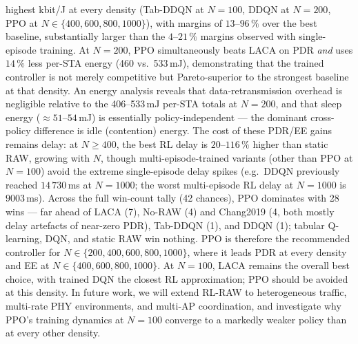 \documentclass[conference]{IEEEtran}
\begin{document}
highest kbit/J at every density (Tab-DDQN at $N=100$, DDQN at $N=200$, PPO
at $N\in\{400,600,800,1000\}$), with margins of $13$--$96\,\%$ over
the best baseline, substantially larger than the
$4$--$21\,\%$ margins observed with single-episode training.
At $N=200$, PPO simultaneously beats LACA on PDR \emph{and} uses $14\,\%$
less per-STA energy (460 vs.\ 533\,mJ), demonstrating that the trained
controller is not merely competitive but Pareto-superior to the strongest
baseline at that density.
An energy analysis reveals that data-retransmission overhead is negligible
relative to the 406--533\,mJ per-STA totals at $N=200$, and that sleep
energy ($\approx51$--$54$\,mJ) is essentially policy-independent — the
dominant cross-policy difference is idle (contention) energy.
The cost of these PDR/EE gains remains delay: at $N\geq400$, the best RL
delay is $20$--$116\,\%$ higher than static RAW, growing with $N$, though
multi-episode-trained variants (other than PPO at $N=100$) avoid the extreme
single-episode delay spikes (e.g.\ DDQN previously reached $14\,730$\,ms at
$N=1000$; the worst multi-episode RL delay at $N=1000$ is $9003$\,ms).
Across the full win-count tally (42 chances), PPO dominates with 28 wins —
far ahead of LACA (7), No-RAW (4) and Chang2019 (4, both mostly delay
artefacts of near-zero PDR), Tab-DDQN (1), and DDQN (1); tabular
Q-learning, DQN, and static RAW win nothing.
PPO is therefore the recommended controller for $N\in\{200,400,600,800,1000\}$,
where it leads PDR at every density and EE at $N\in\{400,600,800,1000\}$.
At $N=100$, LACA remains the overall best choice, with trained DQN the
closest RL approximation; PPO should be avoided at this density.
In future work, we will extend RL-RAW to heterogeneous traffic, multi-rate
PHY environments, and multi-AP coordination, and investigate why PPO's
training dynamics at $N=100$ converge to a markedly weaker policy than at
every other density.
\end{document}
